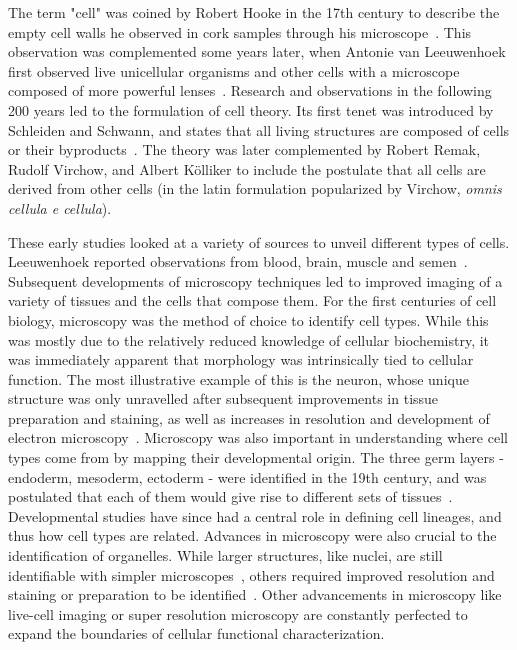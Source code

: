 The term "cell" was coined by Robert Hooke in the 17th century to describe the empty cell walls he observed in cork samples through his microscope~\citep{hooke_micrographia:_1667}. This observation was complemented some years later, when Antonie van Leeuwenhoek first observed live unicellular organisms and other cells with a microscope composed of more powerful lenses~\citep{mazzarello_unifying_1999}. Research and observations in the following 200 years led to the formulation of cell theory. Its first tenet was introduced by Schleiden and Schwann, and states that all living structures are composed of cells or their byproducts~\citep{schwann_microscopical_1847}. The theory was later complemented by Robert Remak, Rudolf Virchow, and Albert Kölliker to include the postulate that all cells are derived from other cells (in the latin formulation popularized by Virchow, \textit{omnis cellula e cellula}).

These early studies looked at a variety of sources to unveil different types of cells. Leeuwenhoek reported observations from blood, brain, muscle and semen~\citep{leeuwenhoeck_m_microscopical_1674,leeuwenhoek_antoni_van_observationes_1677}. Subsequent developments of microscopy techniques led to improved imaging of a variety of tissues and the cells that compose them. For the first centuries of cell biology, microscopy was the method of choice to identify cell types. While this was mostly due to the relatively reduced knowledge of cellular biochemistry, it was immediately apparent that morphology was intrinsically tied to cellular function. The most illustrative example of this is the neuron, whose unique structure was only unravelled after subsequent improvements in tissue preparation and staining, as well as increases in resolution and development of electron microscopy~\citep{mazzarello_unifying_1999}. Microscopy was also important in understanding where cell types come from by mapping their developmental origin. The three germ layers - endoderm, mesoderm, ectoderm - were identified in the 19th century, and was postulated that each of them would give rise to different sets of tissues~\citep{collins_terminology_1995}. Developmental studies have since had a central role in defining cell lineages, and thus how cell types are related. Advances in microscopy were also crucial to the identification of organelles. While larger structures, like nuclei, are still identifiable with simpler microscopes~\citep{brown_organs_1866}, others required improved resolution and staining or preparation to be identified~\citep{golgi_structure_1989}. Other advancements in microscopy like live-cell imaging or super resolution microscopy are constantly perfected to expand the boundaries of cellular functional characterization.

